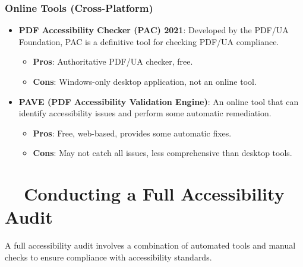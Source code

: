 \subsubsection{Online Tools (Cross-Platform)}
\label{ssubsec:online-tools-pdf}
\begin{itemize}
	\item \textbf{PDF Accessibility Checker (PAC) 2021}: Developed by the PDF/UA Foundation, PAC is a definitive tool for checking PDF/UA compliance.
	      \begin{itemize}
		      \item \textbf{Pros}: Authoritative PDF/UA checker, free.
		      \item \textbf{Cons}: Windows-only desktop application, not an online tool.
	      \end{itemize}
	\item \textbf{PAVE (PDF Accessibility Validation Engine)}: An online tool that can identify accessibility issues and perform some automatic remediation.
	      \begin{itemize}
		      \item \textbf{Pros}: Free, web-based, provides some automatic fixes.
		      \item \textbf{Cons}: May not catch all issues, less comprehensive than desktop tools.
	      \end{itemize}
\end{itemize}

\section{~~Conducting a Full Accessibility Audit}
\label{sec:full-accessibility-audit}
A full accessibility audit involves a combination of automated tools and manual checks to ensure compliance with accessibility standards.

